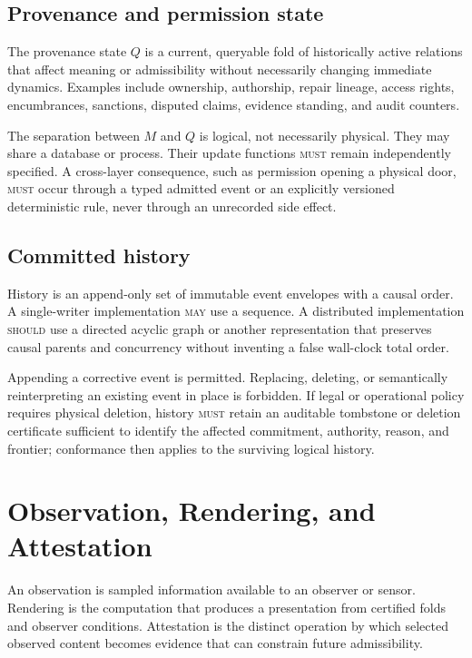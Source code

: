 \documentclass[11pt]{article}
\newcommand{\MUST}{\textsc{must}}
\newcommand{\SHOULD}{\textsc{should}}
\newcommand{\MAY}{\textsc{may}}
\begin{document}
\subsection{Provenance and permission state}

The provenance state $Q$ is a current, queryable fold of historically active relations that affect meaning or admissibility without necessarily changing immediate dynamics. Examples include ownership, authorship, repair lineage, access rights, encumbrances, sanctions, disputed claims, evidence standing, and audit counters.

The separation between $M$ and $Q$ is logical, not necessarily physical. They may share a database or process. Their update functions \MUST{} remain independently specified. A cross-layer consequence, such as permission opening a physical door, \MUST{} occur through a typed admitted event or an explicitly versioned deterministic rule, never through an unrecorded side effect.

\subsection{Committed history}

History is an append-only set of immutable event envelopes with a causal order. A single-writer implementation \MAY{} use a sequence. A distributed implementation \SHOULD{} use a directed acyclic graph or another representation that preserves causal parents and concurrency without inventing a false wall-clock total order.

Appending a corrective event is permitted. Replacing, deleting, or semantically reinterpreting an existing event in place is forbidden. If legal or operational policy requires physical deletion, history \MUST{} retain an auditable tombstone or deletion certificate sufficient to identify the affected commitment, authority, reason, and frontier; conformance then applies to the surviving logical history.

\section{Observation, Rendering, and Attestation}

An observation is sampled information available to an observer or sensor. Rendering is the computation that produces a presentation from certified folds and observer conditions. Attestation is the distinct operation by which selected observed content becomes evidence that can constrain future admissibility.
\end{document}
